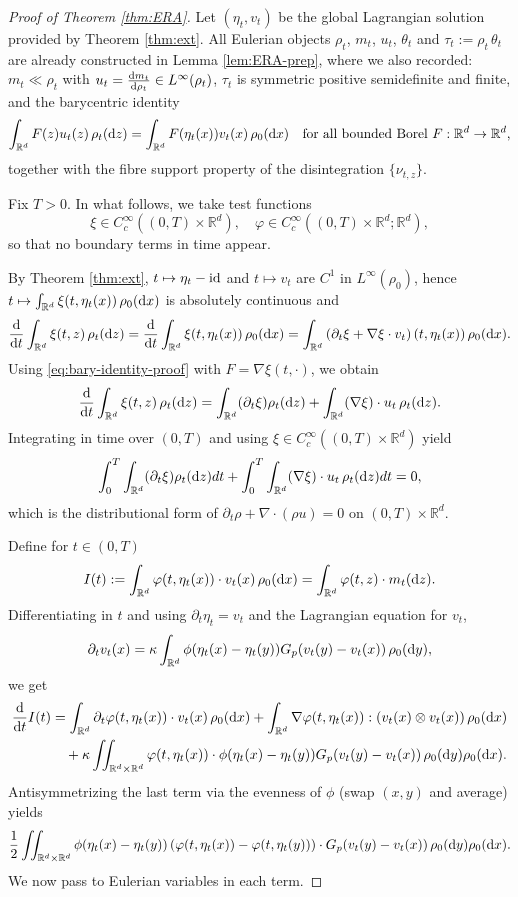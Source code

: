 \documentclass[10pt,reqno]{amsart}
\numberwithin{equation}{section}
\newcommand{\R}{\mathbb R}
\newcommand{\bq}{\begin{equation}}
\newcommand{\eq}{\end{equation}}
\newcommand{\lt}{\left}
\newcommand{\rt}{\right}
\newcommand{\pa}{\partial}
\newcommand{\intr}{\int_{\R^d}}
\newcommand{\intrr}{\iint_{\R^d \times \R^d}}
\newcommand{\rd}{\textnormal{d}}
\newcommand{\dx}{\textnormal{d}x}
\newcommand{\dt}{\textnormal{d}t}
\newcommand{\dy}{\textnormal{d}y}
\newcommand{\dz}{\textnormal{d}z}
\begin{document}
\begin{proof}[Proof of Theorem \ref{thm:ERA}]
Let $(\eta_t,v_t)$ be the global Lagrangian solution provided by Theorem \ref{thm:ext}. All Eulerian objects $\rho_t$, $m_t$, $u_t$, $\theta_t$ and $\tau_t:=\rho_t\,\theta_t$ are already constructed in Lemma \ref{lem:ERA-prep}, where we also recorded: $m_t\ll\rho_t$ with $u_t=\frac{\rd m_t}{\rd\rho_t}\in L^\infty(\rho_t)$, $\tau_t$ is symmetric positive semidefinite and finite, and the barycentric identity
\bq\label{eq:bary-identity-proof}
\intr F(z) u_t(z)\,\rho_t(\dz) =\intr F(\eta_t(x)) v_t(x)\,\rho_0(\dx) \quad\text{for all bounded Borel }F:\R^d\to\R^d,
\eq
together with the fibre support property of the disintegration $\{\nu_{t,z}\}$.

Fix $T>0$. In what follows, we take test functions
\[
\xi\in C_c^\infty((0,T)\times\R^d),\quad \varphi\in C_c^\infty((0,T)\times\R^d;\R^d),
\]
so that no boundary terms in time appear.  

\medskip
{} By Theorem \ref{thm:ext}, $t\mapsto \eta_t- {\rm id}$ and $t\mapsto v_t$ are $C^1$ in $L^\infty(\rho_0)$, hence $t\mapsto \intr \xi(t,\eta_t(x))\,\rho_0(\dx)$ is absolutely continuous and
\[
\frac{\rd}{\dt}\intr \xi(t,z)\,\rho_t(\dz)=\frac{\rd}{\dt}\intr \xi(t,\eta_t(x))\,\rho_0(\dx) = \intr \lt(\pa_t\xi+\nabla\xi\cdot v_t\rt)(t,\eta_t(x))\,\rho_0(\dx).
\]
Using \eqref{eq:bary-identity-proof} with $F=\nabla\xi(t,\cdot)$, we obtain
\[
\frac{\rd}{\dt}\intr \xi(t,z)\,\rho_t(\dz)
=\intr (\pa_t\xi) \rho_t(\dz)+\intr (\nabla\xi)\cdot u_t\,\rho_t(\dz).
\]
Integrating in time over $(0,T)$ and using $\xi\in C_c^\infty((0,T)\times\R^d)$ yield
\[
\int_0^T\intr (\pa_t\xi) \rho_t(\dz)dt+\int_0^T\intr (\nabla\xi)\cdot u_t\,\rho_t(\dz)dt=0 ,
\]
which is the distributional form of $\pa_t\rho+\nabla \cdot(\rho u)=0$ on $(0,T)\times\R^d$.

\medskip
{} Define for $t \in (0,T)$
\[
I(t):=\intr \varphi(t,\eta_t(x))\cdot v_t(x)\,\rho_0(\dx)=\intr \varphi(t,z)\cdot m_t(\dz).
\]
Differentiating in $t$ and using $\pa_t\eta_t=v_t$ and the Lagrangian equation for $v_t$,
\[
\pa_t v_t(x)=\kappa\intr \phi(\eta_t(x)-\eta_t(y)) G_p(v_t(y)-v_t(x))\,\rho_0(\dy),
\]
we get
\begin{align*}
\frac{\rd}{\dt} I(t) &=\intr \pa_t\varphi(t,\eta_t(x))\cdot v_t(x)\,\rho_0(\dx)
 +\intr \nabla\varphi(t,\eta_t(x)) : (v_t(x)\otimes v_t(x))\,\rho_0(\dx)\\
&\quad +\kappa\intrr \varphi(t,\eta_t(x))\cdot \phi(\eta_t(x)-\eta_t(y))G_p(v_t(y)-v_t(x))\,\rho_0(\dy) \rho_0(\dx).
\end{align*}
Antisymmetrizing the last term via the evenness of $\phi$ (swap $(x,y)$ and average) yields
\begin{equation}\label{new}  
\frac12\intrr \phi(\eta_t(x)-\eta_t(y)) \lt(\varphi(t,\eta_t(x))-\varphi(t,\eta_t(y))\rt)\cdot G_p(v_t(y)-v_t(x))\,\rho_0(\dy) \rho_0(\dx).
\end{equation}
We now pass to Eulerian variables in each term.


\end{proof}
\end{document}
